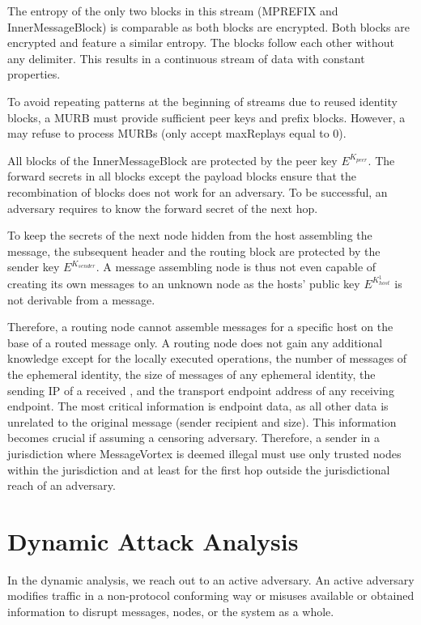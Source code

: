 The entropy of the only two blocks in this stream (MPREFIX and InnerMessageBlock) is comparable as both blocks are encrypted. Both blocks are encrypted and feature a similar entropy. The blocks follow each other without any delimiter. This results in a continuous stream of data with constant properties. 

To avoid repeating patterns at the beginning of streams due to reused identity blocks, a MURB must provide sufficient peer keys and prefix blocks. However, a \VortexNode{} may refuse to process MURBs (only accept maxReplays equal to 0).

All blocks of the InnerMessageBlock are protected by the peer key $E^{K_{peer}}$. The forward secrets in all blocks except the payload blocks ensure that the recombination of blocks does not work for an adversary. To be successful, an adversary requires to know the forward secret of the next hop.

To keep the secrets of the next node hidden from the host assembling the message, the subsequent header and the routing block are protected by the sender key $E^{K_{sender}}$. A message assembling node is thus not even capable of creating its own messages to an unknown node as the hosts' public key $E^{K^{1}_{host}}$ is not derivable from a message.

Therefore, a routing node cannot assemble messages for a specific host on the base of a routed message only. A routing node does not gain any additional knowledge except for the locally executed operations, the number of messages of the ephemeral identity, the size of messages of any ephemeral identity, the sending IP of a received \VortexMessage, and the transport endpoint address of any receiving endpoint. The most critical information is endpoint data, as all other data is unrelated to the original message (sender recipient and size). This information becomes crucial if assuming a censoring adversary. Therefore, a sender in a jurisdiction where MessageVortex{} is deemed illegal must use only trusted nodes within the jurisdiction and at least for the first hop outside the jurisdictional reach of an adversary.


\chapter{Dynamic Attack Analysis}\label{sec:dynamicAnalysis}
In the dynamic analysis, we reach out to an active adversary. An active adversary modifies traffic in a non-protocol conforming way or misuses available or obtained information to disrupt messages, nodes, or the system as a whole.

